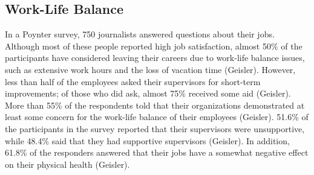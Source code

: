 \begin{multicols}{2}
\section{Work-Life Balance}
    In a Poynter survey, 750 journalists answered questions about their jobs. Although most of these people reported high job satisfaction, almost 50\% of the participants have considered leaving their careers due to work-life balance issues, such as extensive work hours and the loss of vacation time (Geisler). However, less than half of the employees asked their supervisors for short-term improvements; of those who did ask, almost 75\% received some aid (Geisler). More than 55\% of the respondents told that their organizations demonstrated at least some concern for the work-life balance of their employees (Geisler). 51.6\% of the participants in the survey reported that their supervisors were unsupportive, while 48.4\% said that they had supportive supervisors (Geisler). In addition, 61.8\% of the responders answered that their jobs have a somewhat negative effect on their physical health (Geisler). 
\end{multicols}